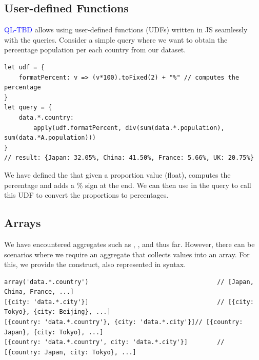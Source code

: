\documentclass[runningheads]{llncs}
\newcommand{\lang}{\textcolor{blue}{QL-TBD}}
\begin{document}



\subsection{User-defined Functions}
\lang{} allows using user-defined functions (UDFs) written in JS seamlessly with the
queries.
Consider a simple query where we want to obtain the percentage population per each
country from our dataset.

\begin{lstlisting}[style=JavaScript, columns=flexible]
let udf = {
    formatPercent: v => (v*100).toFixed(2) + "%" // computes the percentage 
}
let query = {
    data.*.country:
        apply(udf.formatPercent, div(sum(data.*.population), sum(data.*A.population)))
}
// result: {Japan: 32.05%, China: 41.50%, France: 5.66%, UK: 20.75%}
\end{lstlisting}

We have defined the  that given a proportion value (float),
computes the percentage and adds a \% sign at the end.
We can then use  in the query to call this UDF to convert the
proportions to percentages.


\subsection{Arrays}
We have encountered aggregates such as , , and 
thus far.
However, there can be scenarios where we require an aggregate that collects values
into an array.
For this, we provide the  construct, also represented in \inline{[]} syntax.

\begin{lstlisting}[style=JavaScript, columns=flexible]
array('data.*.country')                                   // [Japan, China, France, ...]
[{city: 'data.*.city'}]                                   // [{city: Tokyo}, {city: Beijing}, ...]
[{country: 'data.*.country'}, {city: 'data.*.city'}]// [{country: Japan}, {city: Tokyo}, ...]
[{country: 'data.*.country', city: 'data.*.city'}]        // [{country: Japan, city: Tokyo}, ...]
\end{lstlisting}
\end{document}
